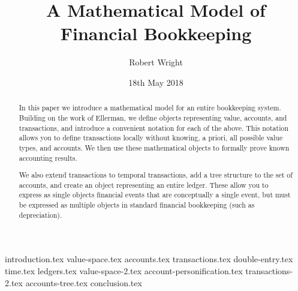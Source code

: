 \documentclass[11pt]{article}
\title{A Mathematical Model of Financial Bookkeeping}
\author{Robert Wright}
\date{18th May 2018}
\begin{document}
    \abovedisplayskip=12pt
    \belowdisplayskip=12pt
    \abovedisplayshortskip=0pt
    \belowdisplayshortskip=7pt

    \begin{titlepage}
        \maketitle

        \begin{abstract}
            In this paper we introduce a mathematical model for an entire bookkeeping system.
            Building on the work of Ellerman, we define objects representing value, accounts, and transactions,
            and introduce a convenient notation for each of the above.
            This notation allows you to define transactions locally \textendash{} without knowing, a priori,
            all possible value types, and accounts.
            We then use these mathematical objects to formally prove known accounting results.

            We also extend transactions to temporal transactions, add a tree structure to the set of accounts,
            and create an object representing an entire ledger.
            These allow you to express as single objects financial events that are conceptually a single event,
            but must be expressed as multiple objects in standard financial bookkeeping
            (such as depreciation).
        \end{abstract}
    \end{titlepage}

    {introduction.tex}
    {value-space.tex}
    {accounts.tex}
    {transactions.tex}
    {double-entry.tex}
    {time.tex}
    {ledgers.tex}
    {value-space-2.tex}
    {account-personification.tex}
    {transactions-2.tex}
    {accounts-tree.tex}
    {conclusion.tex}

    
    
\end{document}
